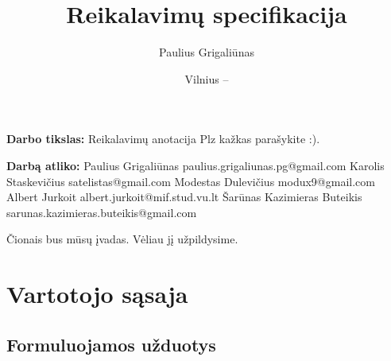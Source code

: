 \documentclass{VUMIFPSkursinis}
\title{Reikalavimų specifikacija}
\author{Paulius Grigaliūnas}
\date{Vilnius – \the\year}
\begin{document}
\maketitle
\cleardoublepage{}
\setcounter{page}{2}



{\bfseries Darbo tikslas:} Reikalavimų anotacija Plz kažkas parašykite :). 
\newline
\newline
\newline

\noindent
{\bfseries Darbą atliko:}
\newline
\newline
\newline
Paulius Grigaliūnas
\newline
paulius.grigaliunas.pg@gmail.com
\newline
\newline
\newline
Karolis Staskevičius
\newline
satelistas@gmail.com
\newline
\newline
\newline
Modestas Dulevičius
\newline
modux9@gmail.com
\newline
\newline
\newline
Albert Jurkoit
\newline
albert.jurkoit@mif.stud.vu.lt
\newline
\newline
\newline
Šarūnas Kazimieras Buteikis
\newline
sarunas.kazimieras.buteikis@gmail.com

\tableofcontents


Čionais bus mūsų įvadas. Vėliau jį užpildysime.
\newline


\section{Vartotojo sąsaja}

\subsection{Formuluojamos užduotys}
\end{document}
